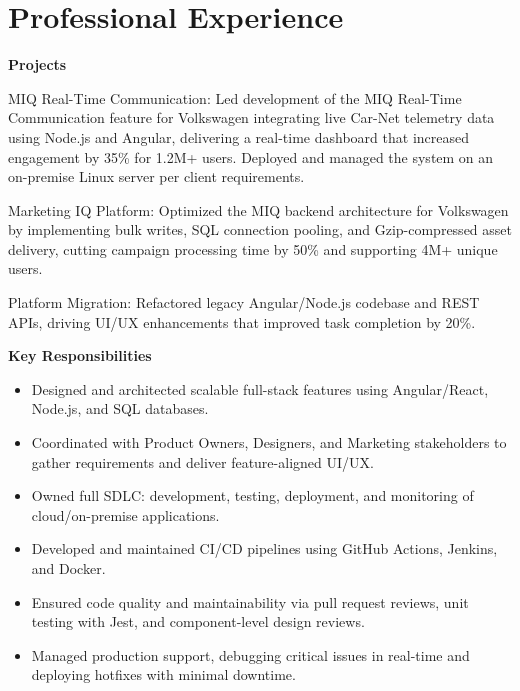 \section{Professional Experience}
\normalsize\textbf{Projects}\vspace{4pt}
\begin{sectionContainer}
	{MIQ Real-Time Communication:} {Led development of the MIQ Real-Time Communication feature for Volkswagen integrating live Car-Net telemetry data using Node.js and Angular, delivering a real-time dashboard that increased engagement by 35\% for 1.2M+ users. Deployed and managed the system on an on-premise Linux server per client requirements.}
\end{sectionContainer}
\begin{sectionContainer}
	{Marketing IQ Platform:} {Optimized the MIQ backend architecture for Volkswagen by implementing bulk writes, SQL connection pooling, and Gzip-compressed asset delivery, cutting campaign processing time by 50\% and supporting 4M+ unique users.}
\end{sectionContainer}
\begin{sectionContainer}
	{Platform Migration:} {Refactored legacy Angular/Node.js codebase and REST APIs, driving UI/UX enhancements that improved task completion by 20\%.}
\end{sectionContainer}

\normalsize\textbf{Key Responsibilities}
\begin{itemize}[leftmargin=12pt,itemsep=0pt,topsep=4pt]
	\item \normalsize{Designed and architected scalable full-stack features using Angular/React, Node.js, and SQL databases.}
	\item \normalsize{Coordinated with Product Owners, Designers, and Marketing stakeholders to gather requirements and deliver feature-aligned UI/UX.}
	\item \normalsize{Owned full SDLC: development, testing, deployment, and monitoring of cloud/on-premise applications.}
	\item \normalsize{Developed and maintained CI/CD pipelines using GitHub Actions, Jenkins, and Docker.}
	\item \normalsize{Ensured code quality and maintainability via pull request reviews, unit testing with Jest, and component-level design reviews.}
	\item \normalsize{Managed production support, debugging critical issues in real-time and deploying hotfixes with minimal downtime.}
\end{itemize}\vspace*{12pt}


